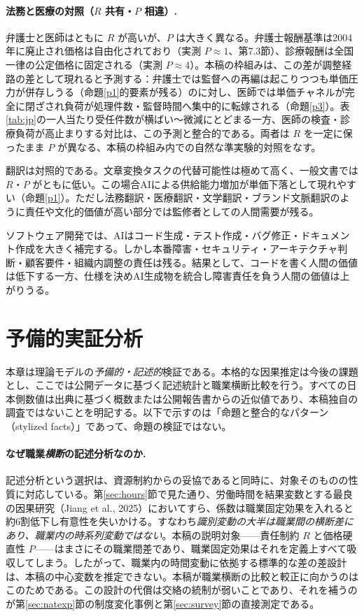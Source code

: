 \documentclass[11pt]{article}
\theoremstyle{plain}
\theoremstyle{definition}
\theoremstyle{remark}
\begin{document}
\paragraph{法務と医療の対照（$R$ 共有・$P$ 相違）.}\label{sec:lawyer-med}
弁護士と医師はともに $R$ が高いが、$P$ は大きく異なる。弁護士報酬基準は2004年に廃止され価格は自由化されており（実測 $P\approx1$、第7.3節）、診療報酬は全国一律の公定価格に固定される（実測 $P\approx4$）。本稿の枠組みは、この差が調整経路の差として現れると予測する：弁護士では監督への再編は起こりつつも単価圧力が併存しうる（命題\ref{p1}的要素が残る）のに対し、医師では単価チャネルが完全に閉ざされ負荷が処理件数・監督時間へ集中的に転嫁される（命題\ref{p3}）。表\ref{tab:jp}の一人当たり受任件数が横ばい〜微減にとどまる一方、医師の検査・診療負荷が高止まりする対比は、この予測と整合的である。両者は $R$ を一定に保ったまま $P$ が異なる、本稿の枠組み内での自然な準実験的対照をなす。

翻訳は対照的である。文章変換タスクの代替可能性は極めて高く、一般文書では $R$・$P$ がともに低い。この場合AIによる供給能力増加が単価下落として現れやすい（命題\ref{p1}）。ただし法務翻訳・医療翻訳・文学翻訳・ブランド文脈翻訳のように責任や文化的価値が高い部分では監修者としての人間需要が残る。

ソフトウェア開発では、AIはコード生成・テスト作成・バグ修正・ドキュメント作成を大きく補完する。しかし本番障害・セキュリティ・アーキテクチャ判断・顧客要件・組織内調整の責任は残る。結果として、コードを書く人間の価値は低下する一方、仕様を決めAI生成物を統合し障害責任を負う人間の価値は上がりうる。

\section{予備的実証分析}\label{sec:emp}

本章は理論モデルの\emph{予備的・記述的}検証である。本格的な因果推定は今後の課題とし、ここでは公開データに基づく記述統計と職業横断比較を行う。すべての日本側数値は出典に基づく概数または公開報告書からの近似値であり、本稿独自の調査ではないことを明記する。以下で示すのは「命題と整合的なパターン（stylized facts）」であって、命題の検証ではない。

\paragraph{なぜ職業\emph{横断}の記述分析なのか.}
記述分析という選択は、資源制約からの妥協であると同時に、対象そのものの性質に対応している。第\ref{sec:hours}節で見た通り、労働時間を結果変数とする最良の因果研究（Jiang et al., 2025）においてすら、係数は職業固定効果を入れると約6割低下し有意性を失いかける。すなわち\emph{識別変動の大半は職業間の横断差にあり、職業内の時系列変動ではない}。本稿の説明対象——責任制約 $R$ と価格硬直性 $P$——はまさにその職業間差であり、職業固定効果はそれを定義上すべて吸収してしまう。したがって、職業内の時間変動に依拠する標準的な差の差設計は、本稿の中心変数を推定できない。本稿が職業横断の比較と較正に向かうのはこのためである。この設計の代償は交絡の統制が弱いことであり、それを補うのが第\ref{sec:natexp}節の制度変化事例と第\ref{sec:survey}節の直接測定である。
\end{document}
